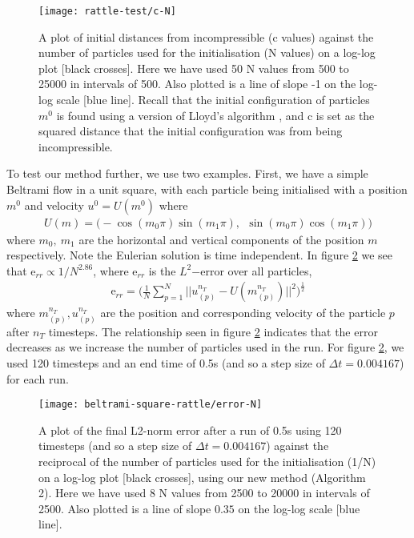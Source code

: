 \documentclass[11pt, oneside]{article}   	%
\newcommand{\dt}{\Delta t}
\begin{document}
\begin{figure}[H]
\texttt{[image: rattle-test/c-N]}
\centering
\caption{A plot of initial distances from incompressible (c values) against the number of particles used for the initialisation (N values) on a log-log plot [black crosses]. Here we have used 50 N values from 500 to 25000 in intervals of 500. Also plotted is a line of slope -1 on the log-log scale [blue line]. Recall that the initial configuration of particles \(m^0\) is found using a version of Lloyd's algorithm \citep{merigot2017algorithm}, and c is set as the squared distance that the initial configuration was from being incompressible. }
\centering
\label{fig:c-N}
\end{figure}

To test our method further, we use two examples. First, we have a simple Beltrami flow in a unit square, with each particle being initialised with a position \(m^0\) and velocity \(u^0 = U(m^0)\) where
\begin{align}
U(m) = \big( -\cos(m_0 \pi) \sin(m_1 \pi), \: \: \sin(m_0 \pi) \cos(m_1 \pi) \big)
\end{align}
where \(m_0, \: m_1\) are the horizontal and vertical components of the position \(m\) respectively. Note the Eulerian solution is time independent. In figure \ref{fig:error-N} we see that \(\text{e}_{rr} \propto 1/N^{2.86}\), where \(\text{e}_{rr}\) is the \(L^2\mathrm{-error}\) over all particles,
\begin{align}
\text{e}_{rr} = \Big( \frac{1}{N} \sum_{p = 1}^{N} || u^{n_T}_{(p)} - U(m^{n_T}_{(p)}) ||^2 \Big) ^\frac{1}{2}
\end{align}
where \(m^{n_T}_{(p)}, u^{n_T}_{(p)}\) are the position and corresponding velocity of the particle \(p\) after \(n_T\) timesteps. The relationship seen in figure \ref{fig:error-N} indicates that the error decreases as we increase the number of particles used in the run. For figure \ref{fig:error-N}, we used 120 timesteps and an end time of 0.5s (and so a step size of \(\dt = 0.004167\)) for each run. 

\begin{figure}[H]
\texttt{[image: beltrami-square-rattle/error-N]}
\centering
\caption{A plot of the final L2-norm error after a run of 0.5s using 120 timesteps (and so a step size of \(\dt = 0.004167\)) against the reciprocal of the number of particles used for the initialisation (1/N) on a log-log plot [black crosses], using our new method (Algorithm 2). Here we have used 8 N values from 2500 to 20000 in intervals of 2500. Also plotted is a line of slope \(0.35\) on the log-log scale [blue line].}
\centering
\label{fig:error-N}
\end{figure}
\end{document}

